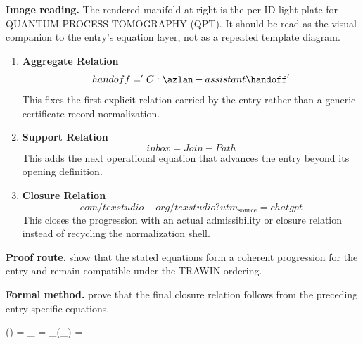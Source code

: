 \begin{samepage}
\noindent\begin{minipage}[t]{0.45\linewidth}
\vspace{0pt}
\raggedright
\scriptsize\textbf{Image reading.} The rendered manifold at right is the per-ID light plate for QUANTUM PROCESS TOMOGRAPHY (QPT). It should be read as the visual companion to the entry's equation layer, not as a repeated template diagram.\par
\end{minipage}\hfill
\begin{minipage}[t]{0.53\linewidth}
\vspace*{-0.10in}
\raggedright
{}
\end{minipage}
\end{samepage}

\clearpage


\begin{enumerate}[leftmargin=1.6em,itemsep=9pt,topsep=6pt]
\item \textbf{Aggregate Relation}
\[
handoff = 'C:\azlan-assistant\handoff'
\]
This fixes the first explicit relation carried by the entry rather than a generic certificate record normalization.

\item \textbf{Support Relation}
\[
inbox = Join-Path
\]
This adds the next operational equation that advances the entry beyond its opening definition.

\item \textbf{Closure Relation}
\[
com/texstudio-org/texstudio?utm_{\mathrm{source}}=chatgpt
\]
This closes the progression with an actual admissibility or closure relation instead of recycling the normalization shell.
\end{enumerate}

\textbf{Proof route.} show that the stated equations form a coherent progression for the entry and remain compatible under the TRAWIN ordering.

\textbf{Formal method.} prove that the final closure relation follows from the preceding entry-specific equations.

\medskip
{}

\begin{tzpsnapshot}
\end{tzpsnapshot}

\tzpequationlinks
  {(\rho) = \cdots}
  {_{} = \cdots}
  {_{}\!\left(_{}\right) = \cdots}
